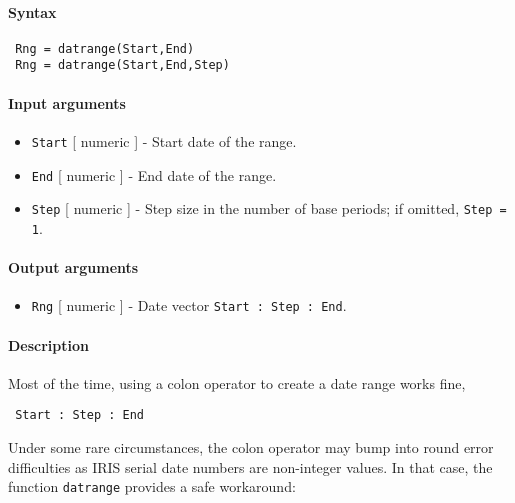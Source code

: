 


	\paragraph{Syntax}
 
 \begin{verbatim}
 Rng = datrange(Start,End)
 Rng = datrange(Start,End,Step)
 \end{verbatim}
 
 \paragraph{Input arguments}
 
 \begin{itemize}
 \item
   \texttt{Start} {[} numeric {]} - Start date of the range.
 \item
   \texttt{End} {[} numeric {]} - End date of the range.
 \item
   \texttt{Step} {[} numeric {]} - Step size in the number of base
   periods; if omitted, \texttt{Step = 1}.
 \end{itemize}
 
 \paragraph{Output arguments}
 
 \begin{itemize}
 \item
   \texttt{Rng} {[} numeric {]} - Date vector
   \texttt{Start : Step : End}.
 \end{itemize}
 
 \paragraph{Description}
 
 Most of the time, using a colon operator to create a date range works
 fine,
 
 \begin{verbatim}
 Start : Step : End
 \end{verbatim}
 
 Under some rare circumstances, the colon operator may bump into round
 error difficulties as IRIS serial date numbers are non-integer values.
 In that case, the function \texttt{datrange} provides a safe workaround:
 
